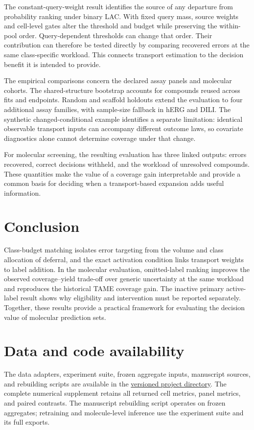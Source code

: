 The constant-query-weight result identifies the source of any departure from probability ranking under binary LAC. With fixed query mass, source weights and cell-level gates alter the threshold and budget while preserving the within-pool order. Query-dependent thresholds can change that order. Their contribution can therefore be tested directly by comparing recovered errors at the same class-specific workload. This connects transport estimation to the decision benefit it is intended to provide.

The empirical comparisons concern the declared assay panels and molecular cohorts. The shared-structure bootstrap accounts for compounds reused across fits and endpoints. Random and scaffold holdouts extend the evaluation to four additional assay families, with sample-size fallback in hERG and DILI. The synthetic changed-conditional example identifies a separate limitation: identical observable transport inputs can accompany different outcome laws, so covariate diagnostics alone cannot determine coverage under that change.

For molecular screening, the resulting evaluation has three linked outputs: errors recovered, correct decisions withheld, and the workload of unresolved compounds. These quantities make the value of a coverage gain interpretable and provide a common basis for deciding when a transport-based expansion adds useful information.

\section{Conclusion}
Class-budget matching isolates error targeting from the volume and class allocation of deferral, and the exact activation condition links transport weights to label addition. In the molecular evaluation, omitted-label ranking improves the observed coverage--yield trade-off over generic uncertainty at the same workload and reproduces the historical TAME coverage gain. The inactive primary active-label result shows why eligibility and intervention must be reported separately. Together, these results provide a practical framework for evaluating the decision value of molecular prediction sets.

\section*{Data and code availability}
The data adapters, experiment suite, frozen aggregate inputs, manuscript sources, and rebuilding scripts are available in the \href{https://github.com/DCarchimonde/aidd-paper-factory/tree/paper2-tame-resubmission-20261112/paper2_latex/resubmission_20261112}{versioned project directory}. The complete numerical supplement retains all returned cell metrics, panel metrics, and paired contrasts. The manuscript rebuilding script operates on frozen aggregates; retraining and molecule-level inference use the experiment suite and its full exports.
